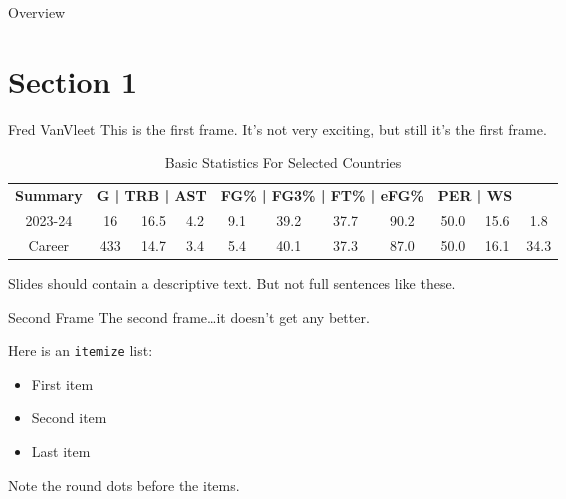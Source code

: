 



\begin{frame}{Overview}
    \tableofcontents
\end{frame}





\section{Section 1}

\begin{frame}{Fred VanVleet}
    This is the first frame.
    It's not very exciting, but still it's the first frame.

    \begin{table}[h]
        
        \begin{tabular}{ ccccccccccc }
            \textbf{Summary} & \multicolumn{3}{c}{\textbf{G | TRB | AST}} & \multicolumn{4}{c}{\textbf{FG\% | FG3\% | FT\% | eFG\%}} & \multicolumn{2}{c}{\textbf{PER | WS}} \\
            2023-24 & 16 & 16.5 & 4.2 & 9.1 & 39.2 & 37.7 & 90.2 & 50.0 & 15.6 & 1.8 \\
            Career & 433 & 14.7 & 3.4 & 5.4 & 40.1 & 37.3 & 87.0 & 50.0 & 16.1 & 34.3 \\
        \end{tabular}
        \caption{Basic Statistics For Selected Countries}
        \label{fig:countries-statistics}
    \end{table}

    Slides should contain a descriptive text.
    But not full sentences like these.
\end{frame}

\begin{frame}{Second Frame}
    The second frame\dots it doesn't get any better.

    Here is an \texttt{itemize} list:
    \begin{itemize}
        \item
        First item

        \item
        Second item

        \item
        Last item
    \end{itemize}
    Note the round dots before the items.
\end{frame}



